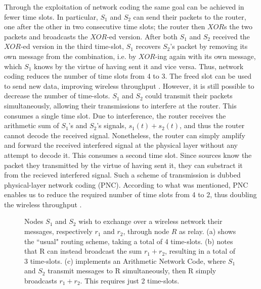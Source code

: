 \documentclass[conference]{IEEEtran}
\begin{document}
Through the exploitation of network coding the same goal can be achieved in fewer time slots. In particular, $S_1$ and $S_2$ can send their packets to the router, one after the other in two consecutive time slots; the router then $XOR$s the two packets and broadcasts the $XOR$-ed version. After both $S_1$ and $S_2$ received the $XOR$-ed version in the third time-slot, $S_1$ recovers $S_2$'s packet by removing its own message from the combination, i.e. by $XOR$-ing again with its own message, which $S_1$ knows by the virtue of having sent it and vice versa. Thus, network coding reduces the number of time slots from 4 to 3. The freed slot can be used to send new data, improving wireless throughput \cite{noh,sizdah}.
However, it is still possible to decrease the number of time-slots. $S_1$ and $S_2$ could transmit their packets simultaneously, allowing their transmissions to interfere at the router. This consumes a single time slot. Due to interference, the router receives the arithmetic sum of $S_1$'s and $S_2$'s signals, $s_1(t) + s_2(t)$, and thus the router cannot decode the received signal. Nonetheless, the router can simply amplify and forward the received interfered signal at the physical layer without any attempt to decode it. This consumes a second time slot. Since sources know the packet they transmitted by the virtue of having sent it, they can substract it from the recieved interfered signal. Such a scheme of transmission is dubbed physical-layer network coding (PNC). According to what was mentioned, PNC enables us to reduce the required number of time slots from 4 to 2, thus doubling the wireless throughput \cite{yek,do}.

\begin{figure*}[ht]
\centering
{}
\caption{Nodes $S_1$ and $S_2$ wish to exchange over a wireless network their messages, respectively $r_1$ and $r_2$, through node $R$ as relay. (a) shows the ``usual" routing scheme, taking a total of 4 time-slots. (b) notes that R can instead broadcast the sum $r_1+ r_2$, resulting in a total of 3 time-slots. (c) implements an Arithmetic Network Code, where $S_1$ and $S_2$ transmit messages to R simultaneously, then R simply broadcasts $r_1+r_2$. This requires just 2 time-slots.}
\vspace{-.1in}
\label{fig:figure1}
\end{figure*}
\end{document}
